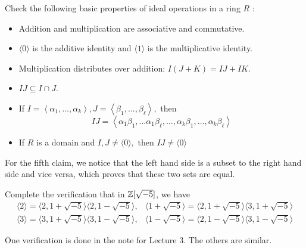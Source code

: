 \documentclass[12pt,twoside=semi,openright,numbers=noenddot]{scrbook}
\begin{document}
\begin{problem}
    Check the following basic properties of ideal operations in a ring $R$ :
    \begin{itemize}
        \item Addition and multiplication are associative and commutative.
        \item $\langle 0\rangle$ is the additive identity and $\langle 1\rangle$ is the multiplicative identity.
        \item Multiplication distributes over addition: $I(J+K)=IJ+IK$.
        \item $I J \subseteq I \cap J$.
        \item If $I=\left\langle\alpha_{1}, \ldots, \alpha_{k}\right\rangle, J=\left\langle\beta_{1}, \ldots, \beta_{\ell}\right\rangle,$ then
        \[
        I J=\left\langle\alpha_{1} \beta_{1}, \ldots \alpha_{1} \beta_{\ell}, \ldots, \alpha_{k} \beta_{1}, \ldots, \alpha_{k} \beta_{\ell}\right\rangle
        \]
        \item If $R$ is a domain and $I, J \neq\langle 0\rangle,$ then $I J \neq\langle 0\rangle$
    \end{itemize}
\end{problem}
    For the fifth claim, we notice that the left hand side is a subset to the right hand side and vice versa, which proves that these two sets are equal.

\begin{problem}
    Complete the verification that in $\mathbb Z[\sqrt{-5}]$, we have
    \[
    \begin{array}{ll}
    \langle 2\rangle=\langle 2,1+\sqrt{-5}\rangle\langle 2,1-\sqrt{-5}\rangle, & \langle 1+\sqrt{-5}\rangle=\langle 2,1+\sqrt{-5}\rangle\langle 3,1+\sqrt{-5}\rangle \\
    \langle 3\rangle=\langle 3,1+\sqrt{-5}\rangle\langle 3,1-\sqrt{-5}\rangle, & \langle 1-\sqrt{-5}\rangle=\langle 2,1-\sqrt{-5}\rangle\langle 3,1-\sqrt{-5}\rangle
    \end{array}
    \]
\end{problem}
    One verification is done in the note for Lecture 3. The others are similar.
    
\end{document}
